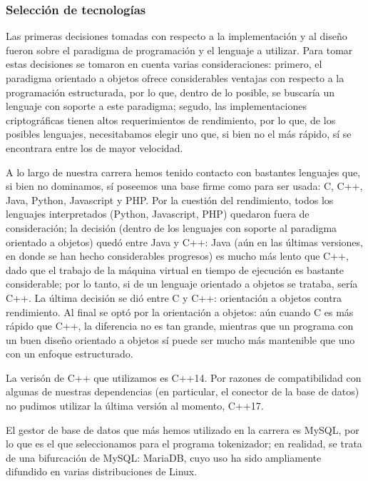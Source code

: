 %
%
%

\subsubsection{Selección de tecnologías}
\label{sec:tecnologias}

Las primeras decisiones tomadas con respecto a la implementación y al diseño
fueron sobre el paradigma de programación y el lenguaje a utilizar. Para
tomar estas decisiones se tomaron en cuenta varias consideraciones: primero,
el paradigma orientado a objetos ofrece considerables ventajas con respecto
a la programación estructurada, por lo que, dentro de lo posible, se buscaría
un lenguaje con soporte a este paradigma; segudo, las implementaciones
criptográficas tienen altos requerimientos de rendimiento, por lo que, de los
posibles lenguajes, necesitabamos elegir uno que, si bien no el más rápido,
sí se encontrara entre los de mayor velocidad.

A lo largo de nuestra carrera hemos tenido contacto con bastantes lenguajes que,
si bien no dominamos, sí poseemos una base firme como para ser usada: C, C++,
Java, Python, Javascript y PHP. Por la cuestión del rendimiento, todos los
lenguajes interpretados (Python, Javascript, PHP) quedaron fuera de
consideración; la decisión (dentro de los lenguajes con soporte al paradigma
orientado a objetos) quedó entre Java y C++: Java (aún en las últimas versiones,
en donde se han hecho considerables progresos) es mucho más lento que C++,
dado que el trabajo de la máquina virtual en tiempo de ejecución es bastante
considerable; por lo tanto, si de un lenguaje orientado a objetos se trataba,
sería C++. La última decisión se dió entre C y C++: orientación a objetos contra
rendimiento. Al final se optó por la orientación a objetos: aún cuando C es
más rápido que C++, la diferencia no es tan grande, mientras que un programa
con un buen diseño orientado a objetos sí puede ser mucho más mantenible que
uno con un enfoque estructurado.

La verisón de C++ que utilizamos es C++14. Por razones de compatibilidad con
algunas de nuestras dependencias (en particular, el conector de la base de
datos) no pudimos utilizar la última versión al momento, C++17.

El gestor de base de datos que más hemos utilizado en la carrera es MySQL,
por lo que es el que seleccionamos para el programa tokenizador; en realidad,
se trata de una bifurcación de MySQL: MariaDB, cuyo uso ha sido ampliamente
difundido en varias distribuciones de Linux.

